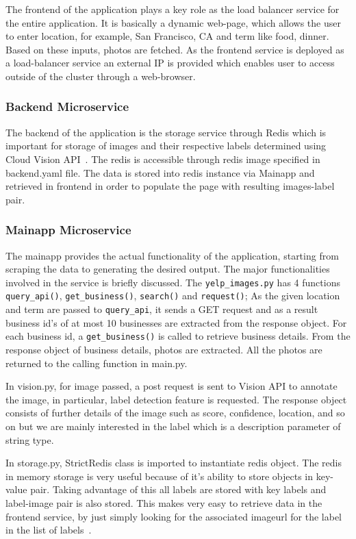 The frontend of the application plays a key role as the load balancer
service for the entire application. It is basically a dynamic
web-page, which allows the user to enter location, for example, San
Francisco, CA and term like food, dinner. Based on these inputs,
photos are fetched. As the frontend service is deployed as a
load-balancer service an external IP is provided which enables user to
access outside of the cluster through a web-browser.

\subsubsection{Backend Microservice} 

The backend of the application is the storage service through Redis
which is important for storage of images and their respective labels
determined using Cloud Vision API~\cite{hid-sp18-602-redis}. The redis
is accessible through redis image specified in backend.yaml file. The
data is stored into redis instance via Mainapp and retrieved in
frontend in order to populate the page with resulting images-label
pair.

\subsubsection{Mainapp Microservice}

The mainapp provides the actual functionality of the application,
starting from scraping the data to generating the desired output. The
major functionalities involved in the service is briefly discussed.
The \verb|yelp_images.py| has 4 functions \verb|query_api()|,
\verb|get_business()|, \verb|search()| and \verb|request()|; As the
given location and term are passed to \verb|query_api|, it sends a GET
request and as a result business id’s of at most 10 businesses are
extracted from the response object. For each business id, a
\verb|get_business()| is called to retrieve business details. From the
response object of business details, photos are extracted. All the
photos are returned to the calling function in main.py.

In vision.py, for image passed, a post request is sent to Vision API
to annotate the image, in particular, label detection feature is
requested. The response object consists of further details of the
image such as score, confidence, location, and so on but we are mainly
interested in the label which is a description parameter of string
type.

In storage.py, StrictRedis class is imported to instantiate redis
object. The redis in memory storage is very useful because of it’s
ability to store objects in key-value pair. Taking advantage of this
all labels are stored with key labels and label-image pair is also
stored. This makes very easy to retrieve data in the frontend service,
by just simply looking for the associated imageurl for the label in
the list of labels~\cite{hid-sp18-602-redis-implementation}.

